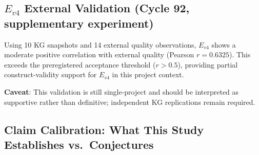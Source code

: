\documentclass[12pt]{article}
\begin{document}
\subsection{$E_{v4}$ External Validation (Cycle 92, supplementary experiment)}

Using 10 KG snapshots and 14 external quality observations,
$E_{v4}$ shows a moderate positive correlation with external quality
(Pearson $r=0.6325$). This exceeds the preregistered acceptance threshold
($r>0.5$), providing partial construct-validity support for $E_{v4}$ in this
project context.

\noindent\textbf{Caveat}: This validation is still single-project and should be
interpreted as supportive rather than definitive; independent KG replications
remain required.

\subsection{Claim Calibration: What This Study Establishes vs.\ Conjectures}
\end{document}
